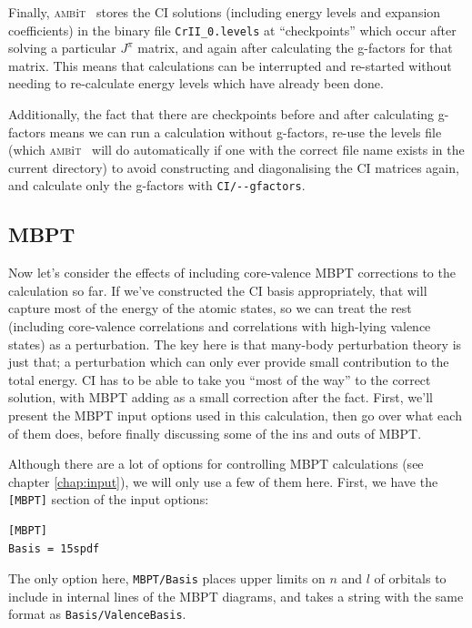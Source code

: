 \documentclass{report}
\newcommand{\ambit}{\textsc{amb}{\footnotesize i}\textsc{t}}
\begin{document}
Finally, \ambit~ stores the CI solutions (including energy levels and expansion coefficients) in the 
binary file \texttt{CrII\_0.levels} at ``checkpoints'' which occur after solving a particular $J^{\pi}$ 
matrix, and again after calculating the g-factors for that matrix. This means that calculations can be
interrupted and re-started without needing to re-calculate energy levels which have already been done.

Additionally, the fact that there are checkpoints before and after calculating g-factors means we can
run a calculation without g-factors, re-use the levels file (which \ambit~ will do automatically if one 
with the correct file name exists in the current directory) to avoid constructing and diagonalising 
the CI matrices again, and calculate only the g-factors with \texttt{CI/{-}{-}gfactors}.

\subsection{MBPT}

Now let's consider the effects of including core-valence MBPT corrections to the calculation so far. If 
we've constructed the CI basis appropriately, that will capture most of the energy of the atomic states,
so we can treat the rest (including core-valence correlations and correlations with high-lying valence 
states) as a perturbation. The key here is that many-body perturbation theory is just that; a 
perturbation which can only ever provide small contribution to the total energy. CI has to be able to 
take you ``most of the way'' to the correct solution, with MBPT adding as a small correction after the 
fact. First, we'll present the MBPT input options used in this calculation, then go over what each of 
them does, before finally discussing some of the ins and outs of MBPT.

Although there are a lot of options for controlling MBPT calculations (see chapter \ref{chap:input}), we
will only use a few of them here. First, we have the \texttt{[MBPT]} section of the input options:

\begin{verbatim}
[MBPT]
Basis = 15spdf
\end{verbatim}

The only option here, \texttt{MBPT/Basis} places upper limits on $n$ and $l$ of orbitals to include in
internal lines of the MBPT diagrams, and takes a string with the same format as
\texttt{Basis/ValenceBasis}.
\end{document}
